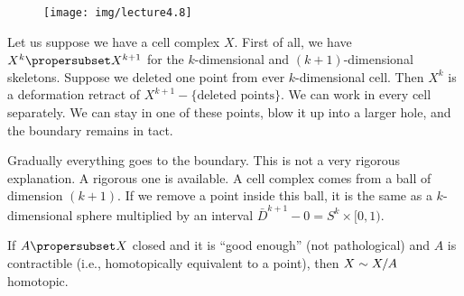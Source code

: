 \begin{wrapfigure}{l}{0.69in}
  \vspace{-14pt}
  \texttt{[image: img/lecture4.8]}
  \vspace{-24pt}
\end{wrapfigure}
Let us suppose we have a cell complex $X$. First of all, we
have $X^{k}\propersubset X^{k+1}$ for the $k$-dimensional and
$(k+1)$-dimensional skeletons. Suppose we deleted one point from
ever $k$-dimensional cell. Then $X^{k}$ is a deformation retract
of $X^{k+1}-\{\mbox{deleted points}\}$. We can work in every cell
separately. We can stay in one of these points, blow it up into a
larger hole, and the boundary remains in tact.

Gradually everything goes to the boundary. This is not a very
rigorous explanation. A rigorous one is available. A cell complex
comes from a ball of dimension $(k+1)$. If we remove a point
inside this ball, it is the same as a $k$-dimensional sphere
multiplied by an interval $\bar{D}^{k+1}-0=S^{k}\times[0,1)$.

\begin{thm}
If $A\propersubset X$ closed and it is ``good enough'' (not
pathological) and $A$ is contractible (i.e., homotopically
equivalent to a point), then $X\sim X/A$ homotopic.
\end{thm}
